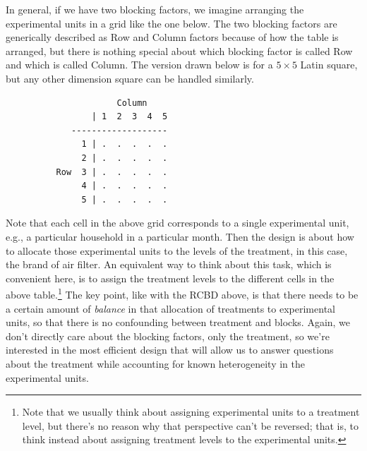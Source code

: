 \documentclass[a4paper, 12pt]{article}
\theoremstyle{plain}
\theoremstyle{definition}
\theoremstyle{remark}
\begin{document}
In general, if we have two blocking factors, we imagine arranging the experimental units in a grid like the one below.  The two blocking factors are generically described as Row and Column factors because of how the table is arranged, but there is nothing special about which blocking factor is called Row and which is called Column.  The version drawn below is for a $5 \times 5$ Latin square, but any other dimension square can be handled similarly.  
{\small
\begin{verbatim}
                      Column 
                 | 1  2  3  4  5
             -------------------
               1 | .  .  .  .  .
               2 | .  .  .  .  .
          Row  3 | .  .  .  .  .
               4 | .  .  .  .  .
               5 | .  .  .  .  .
\end{verbatim}
}
Note that each cell in the above grid corresponds to a single experimental unit, e.g., a particular household in a particular month.  Then the design is about how to allocate those experimental units to the levels of the treatment, in this case, the brand of air filter.  An equivalent way to think about this task, which is convenient here, is to assign the treatment levels to the different cells in the above table.\footnote{Note that we usually think about assigning experimental units to a treatment level, but there's no reason why that perspective can't be reversed; that is, to think instead about assigning treatment levels to the experimental units.}  The key point, like with the RCBD above, is that there needs to be a certain amount of {\em balance} in that allocation of treatments to experimental units, so that there is no confounding between treatment and blocks.  Again, we don't directly care about the blocking factors, only the treatment, so we're interested in the most efficient design that will allow us to answer questions about the treatment while accounting for known heterogeneity in the experimental units.  
\end{document}
